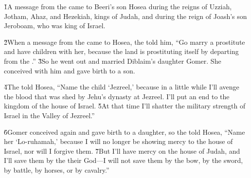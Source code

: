 


\v{1}A message from the  came to Beeri's son Hosea during the reigns of Uzziah, Jotham, Ahaz, and Hezekiah, kings of Judah, and during the reign of Joash's son Jeroboam, who was king of Israel.

\v{2}When a message from the  came to Hosea, the  told him, ``Go marry a prostitute and have children with her, because the land is prostituting itself by departing from the .'' \v{3}So he went out and married Diblaim's daughter Gomer. She conceived with him and gave birth to a son.

\v{4}The  told Hosea, ``Name the child `Jezreel,' because in a little while I'll avenge the blood that was shed by Jehu's dynasty at Jezreel. I'll put an end to the kingdom of the house of Israel. \v{5}At that time I'll shatter the military strength of Israel in the Valley of Jezreel.''

\v{6}Gomer conceived again and gave birth to a daughter, so the  told Hosea, ``Name her `Lo-ruhamah,' because I will no longer be showing mercy to the house of Israel, nor will I forgive them. \v{7}But I'll have mercy on the house of Judah, and I'll save them by the  their God---I will not save them by the bow, by the sword, by battle, by horses, or by cavalry.''

